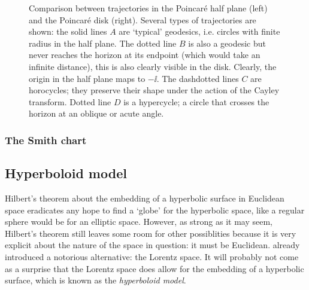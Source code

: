 \begin{figure}[ht]
    \centering
    
    \label{fig:halfplane_disk}
    \caption{Comparison between trajectories in the Poincaré half plane (left) and the Poincaré disk (right). Several types of trajectories are shown: the solid lines \(A\) are `typical' geodesics, i.e. circles with finite radius in the half plane. The dotted line \(B\) is also a geodesic but never reaches the horizon at its endpoint (which would take an infinite distance), this is also clearly visible in the disk. Clearly, the origin in the half plane maps to \(-\ii\). The dashdotted lines \(C\) are horocycles; they preserve their shape under the action of the Cayley transform. Dotted line \(D\) is a hypercycle; a circle that crosses the horizon at an oblique or acute angle.}
\end{figure}

\subsubsection{The Smith chart}

\subsection{Hyperboloid model}
Hilbert's theorem about the embedding of a hyperbolic surface in Euclidean space eradicates any hope to find a `globe' for the hyperbolic space, like a regular sphere would be for an elliptic space. However, as strong as it may seem, Hilbert's theorem still leaves some room for other possiblities because it is very explicit about the nature of the space in question: it must be Euclidean.  already introduced a notorious alternative: the Lorentz space. It will probably not come as a surprise that the Lorentz space does allow for the embedding of a hyperbolic surface, which is known as the \emph{hyperboloid model}.


